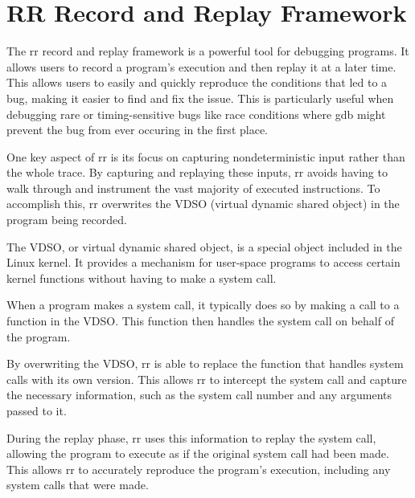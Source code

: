 \section{RR Record and Replay Framework}
The rr record and replay framework is a powerful tool for debugging programs. It allows users to record a program's execution and then replay it at a later time. This allows users to easily and quickly reproduce the conditions that led to a bug, making it easier to find and fix the issue. This is particularly useful when debugging rare or timing-sensitive bugs like race conditions where gdb might prevent the bug from ever occuring in the first place.

One key aspect of rr is its focus on capturing nondeterministic input rather than the whole trace. By capturing and replaying these inputs, rr avoids having to walk through and instrument the vast majority of executed instructions. To accomplish this, rr overwrites the VDSO (virtual dynamic shared object) in the program being recorded. 

The VDSO, or virtual dynamic shared object, is a special object included in the Linux kernel. It provides a mechanism for user-space programs to access certain kernel functions without having to make a system call.

When a program makes a system call, it typically does so by making a call to a function in the VDSO. This function then handles the system call on behalf of the program.

By overwriting the VDSO, rr is able to replace the function that handles system calls with its own version. This allows rr to intercept the system call and capture the necessary information, such as the system call number and any arguments passed to it.

During the replay phase, rr uses this information to replay the system call, allowing the program to execute as if the original system call had been made. This allows rr to accurately reproduce the program's execution, including any system calls that were made. 

